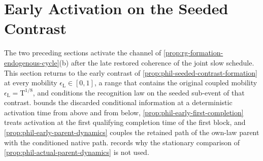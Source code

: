 \section{Early Activation on the Seeded Contrast}
\label{sec:phil-early-parent}

The two preceding sections activate the channel of
\cref{prop:rg-formation-endogenous-cycle}(b) after the late restored
coherence of the joint slow schedule. This section returns to the early
contrast of \cref{prop:phil-seeded-contrast-formation} at every mobility
\(\epsilon_{\mathrm L}\in[0,1]\), a range that contains the original coupled
mobility \(\epsilon_{\mathrm L}=\mathrm T^{1/8}\), and conditions the
recognition law on the seeded sub-event of that contrast.
 bounds the discarded conditional
information at a deterministic activation time from above and from below,
\cref{prop:phil-early-first-completion} treats activation at the first
qualifying completion time of the first block, and
\cref{prop:phil-early-parent-dynamics} couples the retained path of the
own-law parent with the conditioned native path.
 records why the stationary
comparison of \cref{prop:phil-actual-parent-dynamics} is not used.

